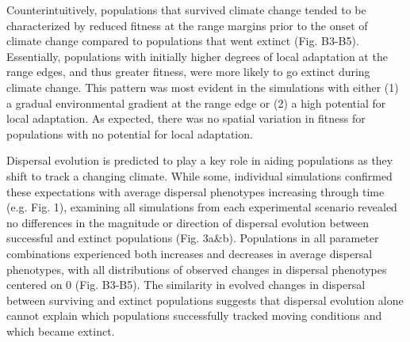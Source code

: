 \documentclass[12pt, oneside]{article}
\begin{document}
Counterintuitively, populations that survived climate change tended to be characterized by reduced fitness at the range margins prior to the onset of climate change compared to populations that went extinct (Fig. B3-B5). Essentially, populations with initially higher degrees of local adaptation at the range edges, and thus greater fitness, were more likely to go extinct during climate change. This pattern was most evident in the simulations with either (1) a gradual environmental gradient at the range edge or (2) a high potential for local adaptation. As expected, there was no spatial variation in fitness for populations with no potential for local adaptation. 

Dispersal evolution is predicted to play a key role in aiding populations as they shift to track a changing climate. While some, individual simulations confirmed these expectations with average dispersal phenotypes increasing through time (e.g. Fig. 1), examining all simulations from each experimental scenario revealed no differences in the magnitude or direction of dispersal evolution between successful and extinct populations (Fig. 3a\&b). Populations in all parameter combinations experienced both increases and decreases in average dispersal phenotypes, with all distributions of observed changes in dispersal phenotypes centered on $0$ (Fig. B3-B5). The similarity in evolved changes in dispersal between surviving and extinct populations suggests that dispersal evolution alone cannot explain which populations successfully tracked moving conditions and which became extinct.
\end{document}
